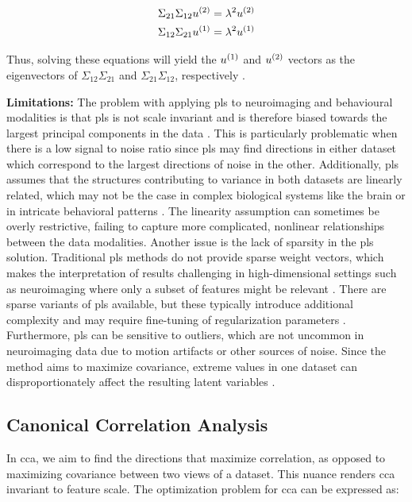 \begin{align}
    \Sigma_{21} \Sigma_{12} u^{(2)} & = \lambda^2 u^{(2)} \\
    \Sigma_{12} \Sigma_{21} u^{(1)} & = \lambda^2 u^{(1)}
\end{align}

Thus, solving these equations will yield the \( u^{(1)} \) and \( u^{(2)} \) vectors as the eigenvectors of \( \Sigma_{12} \Sigma_{21} \) and \( \Sigma_{21} \Sigma_{12} \), respectively \citep{hoskuldsson1988pls}.

\textbf{Limitations: } The problem with applying \acrshort{pls} to neuroimaging and behavioural modalities is that \acrshort{pls} is not scale invariant and
is therefore biased towards the largest principal components in the data \citep{helmer2020stability}.
This is particularly problematic when there is a low signal to noise ratio since \acrshort{pls} may find directions in either dataset which correspond to the largest directions of noise in the other.
Additionally, \acrshort{pls} assumes that the structures contributing to variance in both datasets are linearly related, which
may not be the case in complex biological systems like the brain or in intricate behavioral patterns \citep{rosipal2005overview}.
The linearity assumption can sometimes be overly restrictive, failing to capture more complicated, nonlinear relationships between the data modalities.
Another issue is the lack of sparsity in the \acrshort{pls} solution.
Traditional \acrshort{pls} methods do not provide sparse weight vectors, which makes the interpretation of results challenging in high-dimensional settings such as neuroimaging where only a subset of features might be relevant \citep{leurgans1993canonical}.
There are sparse variants of \acrshort{pls} available, but these typically introduce additional complexity and may require fine-tuning of regularization parameters \citep{chun2010sparse}.
Furthermore, \acrshort{pls} can be sensitive to outliers, which are not uncommon in neuroimaging data due to motion artifacts or other sources of noise.
Since the method aims to maximize covariance, extreme values in one dataset can disproportionately affect the resulting latent variables \citep{wold1975path}.

\subsection{Canonical Correlation Analysis}\label{sec:cca}

In \acrshort{cca}, we aim to find the directions that maximize correlation, as opposed to maximizing covariance between two \gls{views} of a dataset.
This nuance renders \acrshort{cca} invariant to feature scale. The optimization problem for \acrshort{cca} can be expressed as:

